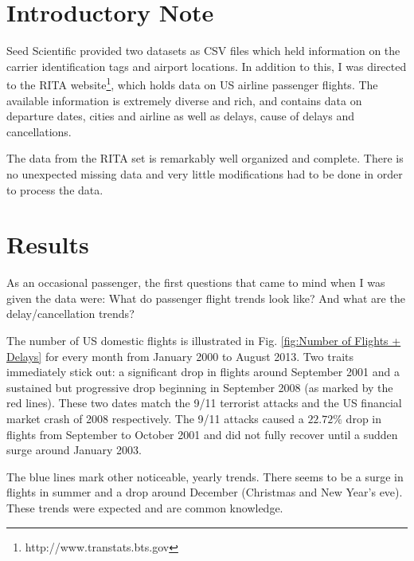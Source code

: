 \documentclass[11pt,twoside,titlepage]{article}
\begin{document}
\section{Introductory Note}

Seed Scientific provided two datasets as CSV files which held information on the carrier identification tags and airport locations. In addition to this, I was directed to the RITA website\footnote{http://www.transtats.bts.gov}, which holds data on US airline passenger flights. The available information is extremely diverse and rich, and contains data on departure dates, cities and airline as well as delays, cause of delays and cancellations.

The data from the RITA set is remarkably well organized and complete. There is no unexpected missing data and very little modifications had to be done in order to process the data.

\section{Results}

As an occasional passenger, the first questions that came to mind when I was given the data were: What do passenger flight trends look like? And what are the delay/cancellation trends? 

The number of US domestic flights is illustrated in Fig. \ref{fig:Number of Flights + Delays} for every month from January 2000 to August 2013. Two traits immediately stick out: a significant drop in flights around September 2001 and a sustained but progressive drop beginning in September 2008 (as marked by the red lines). These two dates match the 9/11 terrorist attacks and the US financial market crash of 2008 respectively. The 9/11 attacks caused a $22.72\%$ drop in flights from September to October 2001 and did not fully recover until a sudden surge around January 2003.

The blue lines mark other noticeable, yearly trends. There seems to be a surge in flights in summer and a drop around December (Christmas and New Year's eve). These trends were expected and are common knowledge.
\end{document}
